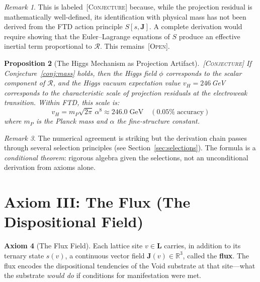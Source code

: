 \documentclass[11pt,twoside]{article}
\theoremstyle{definition}
\newtheorem{axiom}{Axiom}
\theoremstyle{plain}
\newtheorem{proposition}[axiom]{Proposition}
\theoremstyle{remark}
\newtheorem{remark}[axiom]{Remark}
\newcommand{\etag}[1]{\,\textnormal{\textsc{\footnotesize[#1]}}}
\newcommand{\conject}{\etag{Conjecture}}
\newcommand{\openq}{\etag{Open}}
\newcommand{\Lattice}{\mathbf{L}}
\newcommand{\Real}{\mathbb{R}}
\begin{document}
\begin{remark}
This is labeled \conject{} because, while the projection residual is mathematically well-defined, its identification with physical mass has not been derived from the FTD action principle $S[s, \mathbf{J}]$. A complete derivation would require showing that the Euler--Lagrange equations of $S$ produce an effective inertial term proportional to $\mathcal{R}$. This remains \openq.
\end{remark}

\begin{proposition}[The Higgs Mechanism as Projection Artifact]\label{prop:higgs}\conject
If Conjecture~\ref{conj:mass} holds, then the Higgs field $\phi$ corresponds to the scalar component of $\mathcal{R}$, and the Higgs vacuum expectation value $v_H = 246$\,GeV corresponds to the characteristic scale of projection residuals at the electroweak transition. Within FTD, this scale is:
\begin{equation}
    v_H = m_P \sqrt{2\pi}\, \alpha^8 \approx 246.0\;\text{GeV} \quad (0.05\%\;\text{accuracy})
\end{equation}
where $m_P$ is the Planck mass and $\alpha$ the fine-structure constant.
\end{proposition}

\begin{remark}
The numerical agreement is striking but the derivation chain passes through several selection principles (see Section~\ref{sec:selections}). The formula is a \emph{conditional theorem}: rigorous algebra given the selections, not an unconditional derivation from axioms alone.
\end{remark}

\section{Axiom III: The Flux (The Dispositional Field)}

\begin{axiom}[The Flux Field]\label{ax:flux}
Each lattice site $v \in \Lattice$ carries, in addition to its ternary state $s(v)$, a continuous vector field $\mathbf{J}(v) \in \Real^3$, called the \textbf{flux}. The flux encodes the dispositional tendencies of the Void substrate at that site---what the substrate \emph{would do} if conditions for manifestation were met.
\end{axiom}
\end{document}
